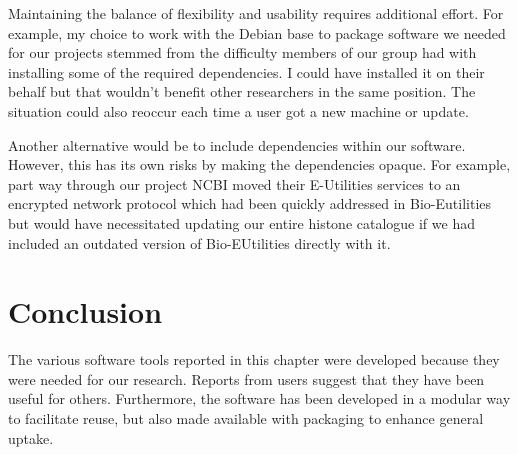 Maintaining the balance of flexibility and usability requires
additional effort.
For example, my choice to work with the Debian base to package software we
needed for our projects stemmed from the difficulty members of our group
had with installing some of the required dependencies.  I could have
installed it on their behalf but that wouldn't benefit other
researchers in the same position.
The situation could also reoccur each time a user got a new
machine or update.

Another alternative would be to include
dependencies within our software.  However, this has its own risks by
making the dependencies opaque.  For example, part way through our project
NCBI moved their E-Utilities services to an encrypted network protocol which had
been quickly addressed in Bio-Eutilities
but would have necessitated updating our
entire histone catalogue  if we had
included an outdated version of Bio-EUtilities directly with it.

\section{Conclusion}

The various software tools reported in this chapter were developed
because they were needed for our research.  Reports from users suggest
that they have been useful for others.  Furthermore, the software has
been developed in a modular way to facilitate reuse, but also made
available with packaging to enhance general uptake.
